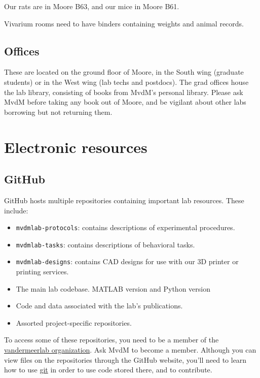 \documentclass{tufte-book}
\newcommand{\doccls}[1]{\texttt{#1}}%
\begin{document}
Our rats are in Moore B63, and our mice in Moore B61.

Vivarium rooms need to have binders containing weights and animal records.

\section{Offices}

These are located on the ground floor of Moore, in the South wing
(graduate students) or in the West wing (lab techs and postdocs). The
grad offices house the lab library, consisting of books from MvdM's
personal library. Please ask MvdM before taking any book out of Moore,
and be vigilant about other labs borrowing but not returning them.

\chapter{Electronic resources}

\section{GitHub}

GitHub hosts multiple repositories containing important lab
resources. These include:

\begin{itemize}

\item{\doccls{mvdmlab-protocols}: contains descriptions of
  experimental procedures.}

\item{\doccls{mvdmlab-tasks}: contains descriptions of behavioral tasks.}

\item{\doccls{mvdmlab-designs}: contains CAD designs for use with our
  3D printer or printing services.}

\item{The main lab codebase. MATLAB version and Python version}

\item{Code and data associated with the lab's publications.}

\item{Assorted project-specific repositories.}

\end{itemize}

To access some of these repositories, you need to be a member of the
\href{www.github.com/vandermeerlab}{vandermeerlab organization}. Ask
MvdM to become a member. Although you can view files on the
repositories through the GitHub website, you'll need to learn how to
use \href{https://www.codecademy.com/learn/learn-git}{git} in order to
use code stored there, and to contribute.
\end{document}
